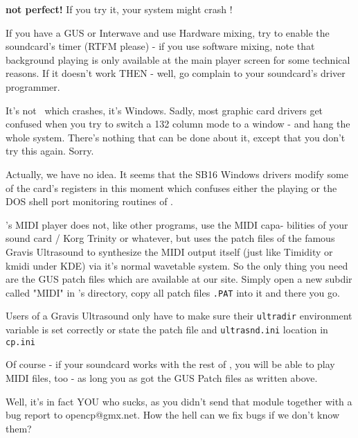 {\textbf{not perfect!} If you try it, your system might crash !}

{If you have a GUS or Interwave and use Hardware mixing, try to enable
the soundcard's timer (RTFM please) - if you use software mixing, note
that background playing is only available at the main player screen
for some technical reasons. If it doesn't work THEN - well, go complain
to your soundcard's driver programmer.}

{It's not \cp\ which crashes, it's Windows. Sadly, most graphic card
drivers get confused when you try to switch a 132 column mode to a
window - and hang the whole system. There's nothing that can be done
about it, except that you don't try this again. Sorry.}

{Actually, we have no idea. It seems that the SB16 Windows drivers modify
some of the card's registers in this moment which confuses either the
playing or the DOS shell port monitoring routines of \cp. }

{\cp's MIDI player does not, like other programs, use the MIDI capa-
bilities of your sound card / Korg Trinity or whatever, but uses the
patch files of the famous Gravis Ultrasound to synthesize the MIDI
output itself (just like Timidity or kmidi under KDE) via it's normal
wavetable system. So the only thing you need are the GUS patch files
which are available at our site. Simply open a new subdir called "MIDI"
in \cp's directory, copy all patch files \texttt{.PAT} into it and there you
go.

Users of a Gravis Ultrasound only have to make sure their \texttt{ultradir}
environment variable is set correctly or state the patch file and
\texttt{ultrasnd.ini} location in \texttt{cp.ini}}

{Of course - if your soundcard works with the rest of \cp, you will be
able to play MIDI files, too - as long you as got the GUS Patch files as
written above.}

{Well, it's in fact YOU who sucks, as you didn't send that module together
with a bug report to opencp@gmx.net. How the hell can we fix bugs if
we don't know them?}

